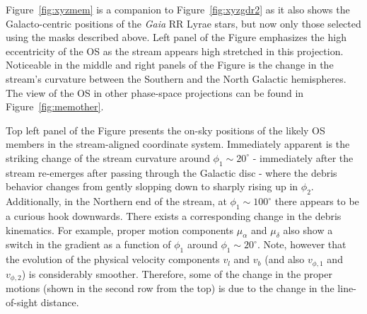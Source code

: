 \documentclass[a4paper,useAMS,usenatbib]{mnras}
\newcommand{\gaia}{\textit{Gaia} }
\begin{document}
Figure~\ref{fig:xyzmem} is a companion to Figure~\ref{fig:xyzgdr2} as
it also shows the Galacto-centric positions of the \gaia RR Lyrae
stars, but now only those selected using the masks described
above. Left panel of the Figure emphasizes the high eccentricity of
the OS as the stream appears high stretched in this
projection. Noticeable in the middle and right panels of the Figure is
the change in the stream's curvature between the Southern and the
North Galactic hemispheres. The view of the OS in other phase-space
projections can be found in Figure~\ref{fig:memother}.

Top left panel of the Figure presents the on-sky positions of the
likely OS members in the stream-aligned coordinate system. Immediately
apparent is the striking change of the stream curvature around
$\phi_1\sim20^{\circ}$ - immediately after the stream re-emerges after
passing through the Galactic disc - where the debris behavior changes
from gently slopping down to sharply rising up in
$\phi_2$. Additionally, in the Northern end of the stream, at
$\phi_1\sim100^{\circ}$ there appears to be a curious hook
downwards. There exists a corresponding change in the debris
kinematics. For example, proper motion components $\mu_{\alpha}$ and
$\mu_{\delta}$ also show a switch in the gradient as a function of
$\phi_1$ around $\phi_1\sim20^{\circ}$. Note, however that the
evolution of the physical velocity components $v_l$ and $v_b$ (and
also $v_{\phi,1}$ and $v_{\phi,2}$) is considerably
smoother. Therefore, some of the change in the proper motions (shown
in the second row from the top) is due to the change in the
line-of-sight distance.
\end{document}
